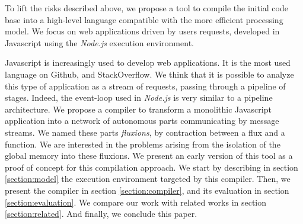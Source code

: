 To lift the risks described above, we propose a tool to compile the initial code base into a high-level language compatible with the more efficient processing model.
We focus on web applications driven by users requests, developed in Javascript using the \textit{Node.js} execution environment.

Javascript is increasingly used to develop web applications.
It is the most used language on Github, and StackOverflow.
We think that it is possible to analyze this type of application as a stream of requests, passing through a pipeline of stages.
Indeed, the event-loop used in \textit{Node.js} is very similar to a pipeline architecture.
We propose a compiler to transform a monolithic Javascript application into a network of autonomous parts communicating by message streams.
We named these parts \textit{fluxions}, by contraction between a flux and a function.
We are interested in the problems arising from the isolation of the global memory into these fluxions.
We present an early version of this tool as a proof of concept for this compilation approach.
We start by describing in section \ref{section:model} the execution environment targeted by this compiler.
Then, we present the compiler in section \ref{section:compiler}, and its evaluation in section \ref{section:evaluation}.
We compare our work with related works in section \ref{section:related}.
And finally, we conclude this paper.